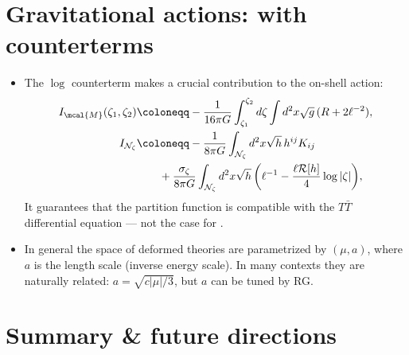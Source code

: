 \documentclass[10pt]{article}
\renewenvironment{frame}[1]%
	{\section*{#1}}%
	{\clearpage}
\begin{document}
\begin{frame}{Gravitational actions: with counterterms}{%
	\textcite{Caputa:2020lpa,Li:2020zjb}
}

\begin{itemize}

\item The $\log$ counterterm makes a crucial contribution to the on-shell action:
	\begin{align*}
		I_{\mcal{M}}(\zeta_1, \zeta_2) & \coloneqq - \frac{1}{16\pi G} \int_{\zeta_1}^{\zeta_2} d\zeta \int d^2 x \sqrt{g} \, (R + 2 \ell^{-2}),  %
	\\
		I_{\mathcal N_{\zeta}} & \coloneqq  - \frac{1}{8\pi G} \int_{\mathcal N_{\zeta}} d^2x \sqrt{h}\,h^{ij} K_{ij} 
	\\& \qquad + \frac{\sigma_\zeta}{8\pi G} \int_{\mathcal N_{\zeta}} d^2x \sqrt{h} \, \bigg(\ell^{-1} - \frac{\ell  \mathcal{R}[h]}{4} \log |\zeta| \bigg), %
	\end{align*}
	It guarantees that the partition function is compatible with the $T\bar T$ differential equation --- not the case for \textsl{\citeauthor{Donnelly:2018bef}}.
	
	\item In general the space of deformed theories are parametrized by $(\mu,a)$, where $a$ is the length scale (inverse energy scale). In many contexts they are naturally related: $a = \sqrt{c|\mu|/3}$, but $a$ can be tuned by RG.
	
\end{itemize}
\end{frame}


\section{Summary \& future directions}
\end{document}
